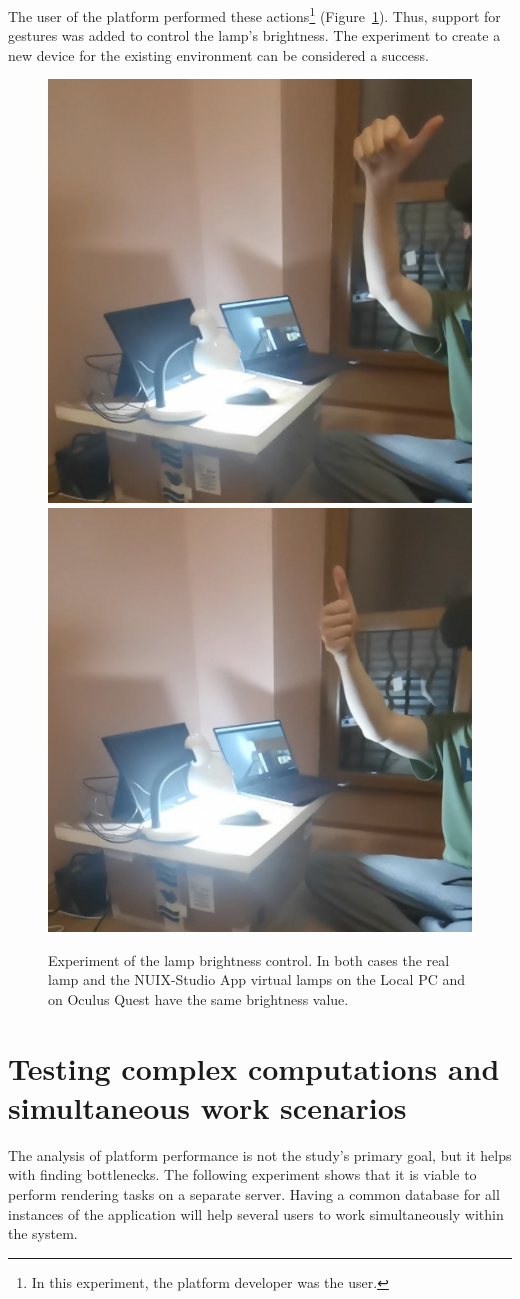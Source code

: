The user of the platform performed these actions\footnote{In this experiment, the platform developer was the user.} (Figure~\ref{fig:BrightnessControl-figure}). Thus, support for gestures was added to control the lamp's brightness. The experiment to create a new device for the existing environment can be considered a success.

\begin{figure}
  \centering
    {\includegraphics[width=0.45\linewidth]{figures/HalflBrightness.jpg}}
    {\includegraphics[width=0.45\linewidth]{figures/FullBrightness.jpg}}
  \caption{Experiment of the lamp brightness control. In both cases the real lamp and the NUIX-Studio App virtual lamps on the Local PC and on Oculus Quest have the same brightness value.}
  \label{fig:BrightnessControl-figure}
\end{figure}

\section{Testing complex computations and simultaneous work scenarios}

The analysis of platform performance is not the study's primary goal, but it helps with finding bottlenecks. The following experiment shows that it is viable to perform rendering tasks on a separate server. Having a common database for all instances of the application will help several users to work simultaneously within the system.

